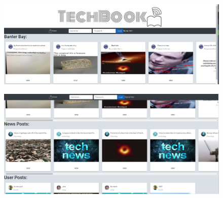 \begin{figure}[H]
\centering
\begin{minipage}{.5\textwidth}
  \centering
  \includegraphics[width=.9\linewidth]{img/ui/headerPC.PNG}
  \label{fig:header}
\end{minipage}%
\begin{minipage}{.5\textwidth}
  \centering
  \includegraphics[width=.9\linewidth]{img/ui/headerpcsticky.PNG}
  \label{fig:headerStick}
\end{minipage}
\end{figure}

